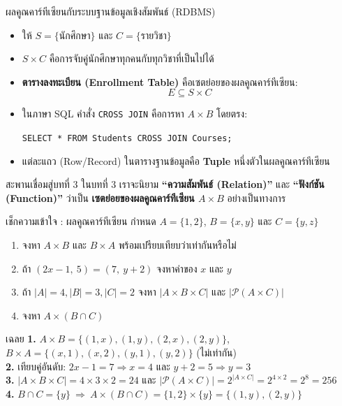 \begin{frame}{ผลคูณคาร์ทีเซียนกับระบบฐานข้อมูลเชิงสัมพันธ์ (RDBMS)}
  \begin{itemize}
    \item ให้ $S = \{\text{นักศึกษา}\}$ และ $C = \{\text{รายวิชา}\}$
    \item $S \times C$ คือการจับคู่นักศึกษาทุกคนกับทุกวิชาที่เป็นไปได้
    \item \textbf{ตารางลงทะเบียน (Enrollment Table)} คือเซตย่อยของผลคูณคาร์ทีเซียน:
          \[ E \subseteq S \times C \]
    \item ในภาษา SQL คำสั่ง \texttt{CROSS JOIN} คือการหา $A \times B$ โดยตรง:
          \begin{center}
          \texttt{SELECT * FROM Students CROSS JOIN Courses;}
          \end{center}
    \item แต่ละแถว (Row/Record) ในตารางฐานข้อมูลคือ \textbf{Tuple} หนึ่งตัวในผลคูณคาร์ทีเซียน
  \end{itemize}
  \vspace{0.2em}
  \begin{exampleblock}{สะพานเชื่อมสู่บทที่ 3}
    ในบทที่ 3 เราจะนิยาม \textbf{``ความสัมพันธ์ (Relation)''} และ \textbf{``ฟังก์ชัน (Function)''}
    ว่าเป็น \textbf{เซตย่อยของผลคูณคาร์ทีเซียน $A \times B$} อย่างเป็นทางการ
  \end{exampleblock}
\end{frame}

\begin{frame}{เช็กความเข้าใจ : ผลคูณคาร์ทีเซียน}
  กำหนด $A = \{1, 2\}$, $B = \{x, y\}$ และ $C = \{y, z\}$
  \begin{enumerate}
    \item จงหา $A \times B$ และ $B \times A$ พร้อมเปรียบเทียบว่าเท่ากันหรือไม่
    \item ถ้า $(2x - 1, \ 5) = (7, \ y + 2)$ จงหาค่าของ $x$ และ $y$
    \item ถ้า $|A| = 4, |B| = 3, |C| = 2$ จงหา $|A \times B \times C|$ และ $|\mathcal{P}(A \times C)|$
    \item จงหา $A \times (B \cap C)$
  \end{enumerate}
  \pause
  \begin{exampleblock}{เฉลย}
    \footnotesize
    \textbf{1.} $A \times B = \{(1,x),(1,y),(2,x),(2,y)\}$, \ $B \times A = \{(x,1),(x,2),(y,1),(y,2)\}$ (ไม่เท่ากัน) \\
    \textbf{2.} เทียบคู่อันดับ: $2x - 1 = 7 \Rightarrow x = 4$ และ $y + 2 = 5 \Rightarrow y = 3$ \\
    \textbf{3.} $|A \times B \times C| = 4 \times 3 \times 2 = 24$ \quad และ \quad $|\mathcal{P}(A \times C)| = 2^{|A \times C|} = 2^{4 \times 2} = 2^8 = 256$ \\
    \textbf{4.} $B \cap C = \{y\} \ \Rightarrow\ A \times (B \cap C) = \{1,2\} \times \{y\} = \{(1,y), (2,y)\}$
  \end{exampleblock}
\end{frame}


